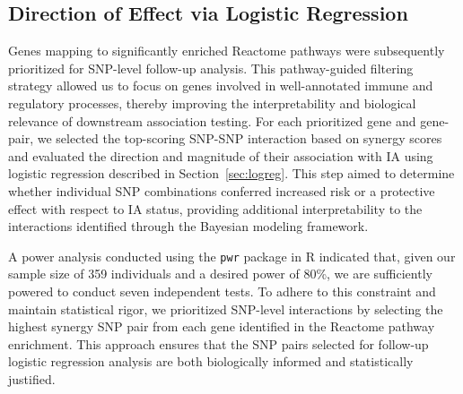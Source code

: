 \documentclass{article}\usepackage[]{graphicx}\usepackage[]{color}
\begin{document}
\subsection{Direction of Effect via Logistic Regression}
Genes mapping to significantly enriched Reactome pathways were subsequently prioritized for SNP-level follow-up analysis. This pathway-guided filtering strategy allowed us to focus on genes involved in well-annotated immune and regulatory processes, thereby improving the interpretability and biological relevance of downstream association testing. For each prioritized gene and gene-pair, we selected the top-scoring SNP-SNP interaction based on synergy scores and evaluated the direction and magnitude of their association with IA using logistic regression described in Section~\ref{sec:logreg}. This step aimed to determine whether individual SNP combinations conferred increased risk or a protective effect with respect to IA status, providing additional interpretability to the interactions identified through the Bayesian modeling framework.
\par
A power analysis conducted using the \texttt{pwr}\cite{champelyPwrBasicFunctions2020} package in R indicated that, given our sample size of 359 individuals and a desired power of 80\%, we are sufficiently powered to conduct seven independent tests. To adhere to this constraint and maintain statistical rigor, we prioritized SNP-level interactions by selecting the highest synergy SNP pair from each gene identified in the Reactome pathway enrichment. This approach ensures that the SNP pairs selected for follow-up logistic regression analysis are both biologically informed and statistically justified.
\end{document}
